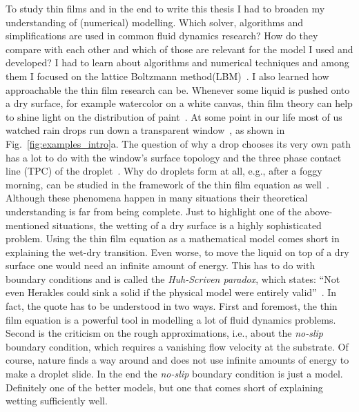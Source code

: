 To study thin films and in the end to write this thesis I had to broaden my understanding of (numerical) modelling. 
Which solver, algorithms and simplifications are used in common fluid dynamics research?
How do they compare with each other and which of those are relevant for the model I used and developed? 
I had to learn about algorithms and numerical techniques and among them I focused on the lattice Boltzmann method(LBM)~\cite{benziLatticeBoltzmannEquation1992a, chenLatticeBoltzmannMethod1998, heTheoryLatticeBoltzmann1997, guoDiscreteLatticeEffects2002, krugerLatticeBoltzmannMethod2017}.
I also learned how approachable the thin film research can be. 
Whenever some liquid is pushed onto a dry surface, for example watercolor on a white canvas, thin film theory can help to shine light on the distribution of paint~\cite{thielePatternedDepositionMoving2014, oronLongscaleEvolutionThin1997, edwardsNotSpreadingReverse2016}. 
At some point in our life most of us watched rain drops run down a transparent window~\cite{wilczekSlidingDropsEnsemble2017}, as shown in Fig.~\ref{fig:examples_intro}a. 
The question of why a drop chooses its very own path has a lot to do with the window's surface topology and the three phase contact line (TPC) of the droplet~\cite{cassieWettabilityPorousSurfaces1944, suzukiSlidingBehaviorWater2008, liuActuatingWaterDroplets2015}. 
Why do droplets form at all, e.g.,  after a foggy morning, can be studied in the framework of the thin film equation as well~\cite{zhangInkjetPrintingDirect2015, shiFogHarvestingHarps2018}.
Although these phenomena happen in many situations their theoretical understanding is far from being complete.
Just to highlight one of the above-mentioned situations, the wetting of a dry surface is a highly sophisticated problem.
Using the thin film equation as a mathematical model comes short in explaining the wet-dry transition.
Even worse, to move the liquid on top of a dry surface one would need an infinite amount of energy.
This has to do with boundary conditions and is called the \textit{Huh-Scriven paradox}, which states: ``Not even Herakles could sink a solid if the physical model were entirely valid''~\cite{huhHydrodynamicModelSteady1971}.
In fact, the quote has to be understood in two ways. 
First and foremost, the thin film equation is a powerful tool in modelling a lot of fluid dynamics problems.
Second is the criticism on the rough approximations, i.e., about the \textit{no-slip} boundary condition, which requires a vanishing flow velocity at the substrate.
Of course, nature finds a way around and does not use infinite amounts of energy to make a droplet slide. 
In the end the \textit{no-slip} boundary condition is just a model.
Definitely one of the better models, but one that comes short of explaining wetting sufficiently well.

